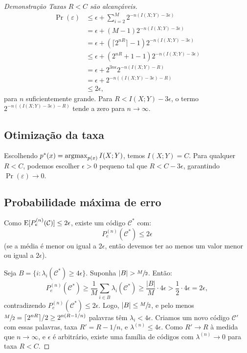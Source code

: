 \begin{proof}[Demonstração Taxas $R < C$ são alcançáveis]
\begin{subequations}
\begin{align}
    \Pr(\varepsilon) &\leq \epsilon + \sum_{i=2}^M 2^{-n(I(X;Y) - 3\epsilon)} \\
                     &= \epsilon + (M - 1) 2^{-n(I(X;Y) - 3\epsilon)} \\
                     &= \epsilon + (\lceil2^{nR}\rceil - 1) 2^{-n(I(X;Y)-3\epsilon)} \\
                     &\leq \epsilon + ( 2^{nR} + 1 - 1 ) 2^{-n(I(X;Y)-3\epsilon)} \\
                     &=\epsilon + 2^{3n\epsilon} 2^{-n(I(X;Y)-R)} \\
                     &= \epsilon + 2^{-n((I(X;Y)-3\epsilon)-R)} \\
                     &\leq 2 \epsilon , 
  \end{align}
\end{subequations}
para $n$ suficientemente grande.
Para $R < I(X;Y) - 3\epsilon$, o termo $2^{-n((I(X;Y)-3\epsilon)-R)}$ tende a zero para
$n \rightarrow \infty$. 

\subsection*{Otimização da taxa}
Escolhendo $p^*(x) = \operatorname*{\arg\!\max}_{p(x)} I(X;Y)$, temos $I(X;Y) = C$. Para qualquer
$R < C$, podemos escolher $\epsilon > 0$ pequeno tal que $R < C - 3\epsilon$,
garantindo $\Pr(\varepsilon) \to 0$.

\subsection*{Probabilidade máxima de erro}
Como $\mathrm{E}[P_e^{(n)}(\mathcal{C})] \leq 2\epsilon$, existe um código $\mathcal{C}^*$ com:
\begin{equation}
P_e^{(n)}(\mathcal{C}^*) \leq 2\epsilon 
\end{equation}
(se a média é menor ou igual a $2\epsilon$, então devemos ter ao menos um valor menor ou igual a $2\epsilon$).

Seja $B = \{i : \lambda_i(\mathcal{C}^*) \geq 4\epsilon\}$. Suponha $|B| > \sfrac{M}{2}$. Então:
\begin{equation}
P_e^{(n)}(\mathcal{C}^*) \geq \frac{1}{M} \sum_{i \in B} \lambda_i(\mathcal{C}^*) \geq \frac{|B|}{M} \cdot 4\epsilon > \frac{1}{2} \cdot 4\epsilon = 2\epsilon,
\end{equation}
contradizendo $P_e^{(n)}(\mathcal{C}^*) \leq 2\epsilon$. Logo, $|B| \leq \sfrac{M}{2}$,
e pelo menos $\sfrac{M}{2} = \lceil 2^{nR} \rceil / 2 \geq 2^{n(R - 1/n)}$ palavras
têm $\lambda_i < 4\epsilon$. Criamos um novo código $\mathcal{C}'$ com essas
palavras, taxa $R' = R - 1/n$, e $\lambda^{(n)} \leq 4\epsilon$. Como $R' \to
R$ à medida que $n \to \infty$, e $\epsilon$ é arbitrário, existe uma família
de códigos com $\lambda^{(n)} \to 0$ para taxa $R < C$.
\end{proof}



